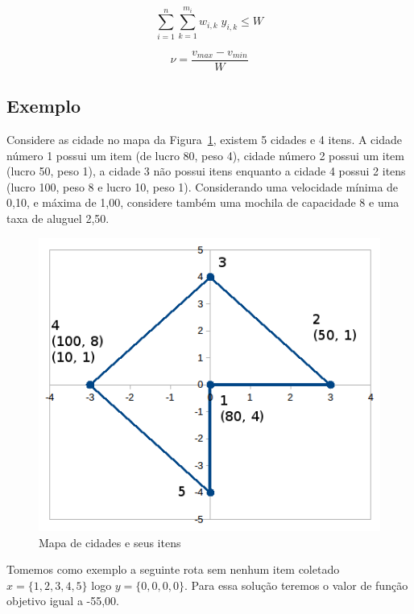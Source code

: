 \noindent\begin{minipage}{.5\linewidth}
\begin{equation}\label{eq:capacity}
\sum\limits_{i=1}^n\sum\limits_{k = 1}^{m_i} w_{i,k}\;y_{i,k} \le W
\end{equation}

\end{minipage}
\noindent\begin{minipage}{.5\linewidth}
\begin{equation} \label{eq:currentSpeed}
\nu = \frac{v_{max} - v_{min}}{W}
\end{equation}
\end{minipage}

\subsection{Exemplo}\label{subsec:pmbExemplo}

Considere as cidade no mapa da Figura~\ref{fig:mapaItens}, existem 5 cidades e 4 itens. A cidade número 1 possui um item (de lucro 80, peso 4), cidade número 2 possui um item (lucro 50, peso 1), a cidade 3 não possui itens enquanto a cidade 4 possui 2 itens (lucro 100, peso 8 e lucro 10, peso 1).
Considerando uma velocidade mínima de 0,10, e máxima de 1,00, considere também uma mochila de capacidade 8 e uma taxa de aluguel 2,50.

\begin{figure}[htpb]
    \centering
    \includegraphics[width=0.6\linewidth]{figuras/pmv/mapaItens}
    \caption{Mapa de cidades e seus itens}
    \label{fig:mapaItens}
\end{figure}

Tomemos como exemplo a seguinte rota sem nenhum item coletado $x = \{ 1, 2, 3, 4, 5 \}$ logo $y = \{ 0, 0, 0, 0 \}$.
Para essa solução teremos o valor de função objetivo igual a -55,00.

